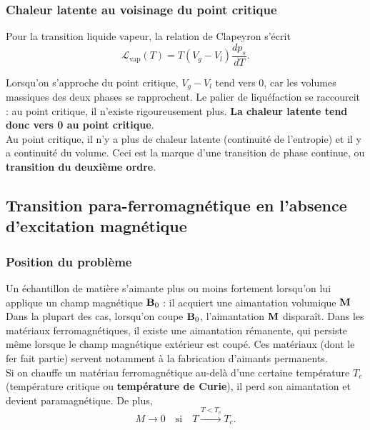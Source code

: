 \documentclass[11pt,a4paper]{report}
\begin{document}
\subsubsection*{Chaleur latente au voisinage du point critique}

Pour la transition liquide vapeur, la relation de Clapeyron s'écrit
\begin{equation}
	\mathcal{L}_\text{vap}(T) = T(V_g - V_l)\frac{dp_s}{dT}.
\end{equation}

Lorsqu'on s'approche du point critique, $V_g - V_l$ tend vers 0, car les volumes massiques des deux phases se rapprochent. Le palier de liquéfaction se raccourcit : au point critique, il n'existe rigoureusement plus. \textbf{La chaleur latente tend donc vers 0 au point critique}.\\

Au point critique, il n'y a plus de chaleur latente (continuité de l'entropie) et il y a continuité du volume. Ceci est la marque d'une transition de phase continue, ou \textbf{transition du deuxième ordre}.

\subsection{Transition para-ferromagnétique en l'absence d'excitation magnétique}

\subsubsection*{Position du problème}
Un échantillon de matière s'aimante plus ou moins fortement lorsqu'on lui applique un champ magnétique $\bold{B}_0$ : il acquiert une aimantation volumique $\bold{M}$ Dans la plupart des cas, lorsqu'on coupe $\bold{B}_0$, l'aimantation $\bold{M}$ disparaît. Dans les matériaux ferromagnétiques, il existe une aimantation rémanente, qui persiste même lorsque le champ magnétique extérieur est coupé. Ces matériaux (dont le fer fait partie) servent notamment à la fabrication d'aimants permanents.\\

Si on chauffe un matériau ferromagnétique au-delà d'une certaine température $T_c$ (température critique ou \textbf{température de Curie}), il perd son aimantation et devient paramagnétique. De plus,
\begin{equation}
	M \rightarrow 0 \quad\text{si}\quad T \xrightarrow{T < T_c} T_c.
\end{equation}
\end{document}
